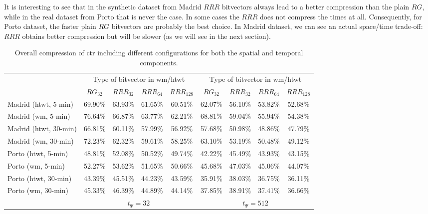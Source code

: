 	It is interesting to see that in the synthetic dataset from Madrid $RRR$ bitvectors always lead to a better 
	compression than the plain $RG$, while in the real dataset from Porto that is never the case. 
	In some cases the $RRR$ does not compress the times at all. Consequently, for Porto dataset, the faster plain $RG$ 
	bitvectors are probably the best choice. In Madrid dataset, we can see an actual space/time trade-off: $RRR$ obtains better
	compression but will be slower (as we will see in the next section).



	\begin{table}[ht!]
	\begin{center}
	\scriptsize
	\setlength\tabcolsep{2pt}
	  \begin{tabular}{|l|*{4}{c}|*{4}{c}|}
	  \cline{2-9}
	  \multicolumn{1}{c|}{} & \multicolumn{4}{c|}{Type of bitvector in \gls{wm}/\gls{htwt}}& \multicolumn{4}{c|}{Type of bitvector in \gls{wm}/\gls{htwt}} \\

	  \multicolumn{1}{c|}{}     &$RG_{32}$& $RRR_{32}$& $RRR_{64}$&$RRR_{128}$&$RG_{32}$& $RRR_{32}$& $RRR_{64}$&$RRR_{128}$ \\
	  \hline                                             
	  Madrid (\gls{htwt}, 5-min)  & 69.90\% &   63.93\% &   61.65\% &   60.51\% & 62.07\% &	56.10\% &	53.82\% &	 52.68\% \\
	  Madrid (\gls{wm}, 5-min)     & 76.64\% &   66.87\% &   63.77\% &   62.21\% & 68.81\% &	59.04\% &	55.94\% &	 54.38\% \\
	  Madrid (\gls{htwt}, 30-min) & 66.81\% &   60.11\% &   57.99\% &   56.92\% & 57.68\% &	50.98\% &	48.86\% &	 47.79\% \\
	  Madrid (\gls{wm}, 30-min)    & 72.23\% &   62.32\% &   59.61\% &   58.25\% & 63.10\% &	53.19\% &	50.48\% &	 49.12\% \\
	  \hline
	  Porto (\gls{htwt}, 5-min)   & 48.81\% &   52.08\% &   50.52\% &   49.74\% & 42.22\% &	45.49\% &	43.93\% &	 43.15\% \\
	  Porto (\gls{wm}, 5-min)      & 52.27\% &   53.62\% &   51.65\% &   50.66\% & 45.68\% &	47.03\% &	45.06\% &	 44.07\% \\
	  Porto (\gls{htwt}, 30-min)  & 43.39\% &   45.51\% &   44.23\% &   43.59\% & 35.91\% &	38.03\% &	36.75\% &	 36.11\% \\
	  Porto (\gls{wm}, 30-min)     & 45.33\% &   46.39\% &   44.89\% &   44.14\% & 37.85\% &	38.91\% &	37.41\% &	 36.66\% \\
	  \hline
	  \cline{2-9}
	  \multicolumn{1}{c|}{} & \multicolumn{4}{c|}{$t_{\Psi}=32$}& \multicolumn{4}{c|}{$t_{\Psi}=512$} \\
		\cline{2-9}
	  \end{tabular}
	\caption{Overall compression of \acrshort{ctr} including different configurations for both the spatial and temporal components.  }
	\label{table:ctr_spaces}
	\vspace{-4mm}
	\end{center}
	\end{table}


